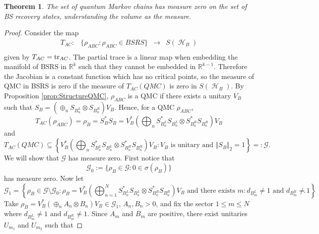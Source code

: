 \documentclass[11pt]{article}
\theoremstyle{newdefinition}
\theoremstyle{newplain}
\newtheorem{theorem}[definition]{Theorem}
\theoremstyle{myplain}
\DeclareMathOperator{\HH}{\mathcal{H}}
\DeclareMathOperator{\1}{\mathds{1}}
\begin{document}
\begin{theorem}\label{rem:measure}
    The set of quantum Markov chains has measure  zero on the  set of  BS recovery states, understanding the volume as the measure.
\end{theorem}
\begin{proof}
      Consider the   map 
    \begin{equation}
    \begin{array}{cccc}
        T_{AC}:& \{\rho_{ABC}: \rho_{ABC} \in BSRS\} &\to &  S(\HH_B)\\
    \end{array}
    \end{equation}
    given by $T_{AC}=\tr_{AC}$. The partial trace is a linear map when embedding  the manifold of BSRS in  $\mathbb{R}^k$ such that they cannot be embedded in $\mathbb{R}^{k-1}$. Therefore the Jacobian is a constant function which has no critical points, so the measure of QMC in BSRS is zero if the measure of $T_{AC}(QMC)$ is zero in $S(\HH_B)$.  By Proposition \ref{prop:StructureQMC}, $\rho_{ABC}$ is a QMC if there exists a unitary $V_B$  such that $S_B=\left(\oplus_n S_{B_n^L}\otimes S_{B_n^R}\right)V_B$. Hence, for a QMC $\rho_{ABC}$,
    \begin{equation}
        T_{AC}(\rho_{ABC})=\rho_B=S_B^*S_B=V_B^*\left(\bigoplus_n S_{B_n^L}^*S_{B_n^L}\otimes S_{B_n^R}^*S_{B_n^R}\right)V_B
    \end{equation}
    and
    \begin{equation}
        T_{AC}(QMC)\subseteq \left\{V_B^*\left(\bigoplus_n S_{B_n^L}^*S_{B_n^L}\otimes S_{B_n^R}^*S_{B_n^R}\right)V_B : V_B \text{ is unitary and } \Vert S_B \Vert_2=1 \right\} =:\mathcal{G}.
    \end{equation}
    We will show that $\mathcal{G}$ has measure zero. First notice that 
\begin{equation}
    \mathcal{G}_0:=\{ \rho_B \in \mathcal{G}: 0 \in \sigma(\rho_B)\}
\end{equation}
has measure zero. Now let 
\begin{equation}
    \mathcal{G}_1=\left\{ \rho_B \in \mathcal{G}\setminus \mathcal{G}_0: \rho_B=V_B^*\left(\bigoplus_{n=1}^N S_{B_n^L}^*S_{B_n^L}\otimes S_{B_n^R}^*S_{B_n^R}\right)V_B \text{ and there exists } m: d_{B_m^L}\neq 1 \text{ and } d_{B_m^R}\neq 1\right\}.
\end{equation}
Take $\rho_B=V_B^*(\oplus_n A_n \otimes B_n)V_B \in \mathcal{G}_1$, $A_n,B_n >0$, and  fix  the sector $1 \leq m \leq N$ where $d_{B_m^L}\neq 1 \text{ and } d_{B_m^R}\neq 1$. Since $A_m$ and $B_m$ are positive, there exist unitaries $U_{m_1}$ and $U_{m_2}$ such that

\end{proof}
\end{document}
